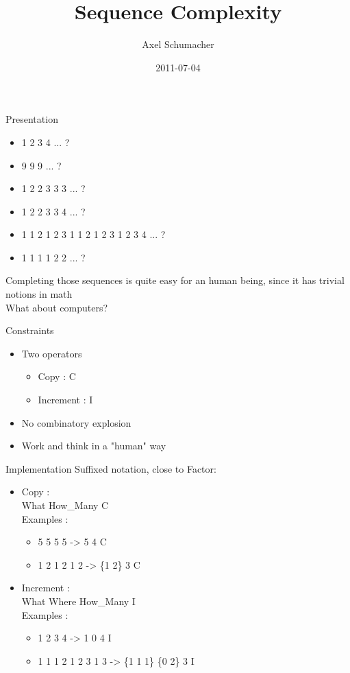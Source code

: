 \documentclass{beamer}
\title[Free Project]{Sequence Complexity}
\author{Axel Schumacher}
\institute{Télécom Paristech}
\date{2011-07-04}
\begin{document}
\begin{frame}
  \titlepage
\end{frame}

\begin{frame}{Presentation}
  \begin{itemize}
    \item{1 2 3 4 ... ?}
    \item{9 9 9 ... ?}
    \item{1 2 2 3 3 3 ... ?}
    \item{1 2 2 3 3 4 ... ?}
    \item{1 1 2 1 2 3 1 1 2 1 2 3 1 2 3 4 ... ?}
    \item{1 1 1 1 2 2 ... ? }
  \end{itemize}
  \begin{center}
  Completing those sequences is quite easy for an human being, since it has trivial notions in math\\
  What about computers?
  \end{center}
\end{frame}

\begin{frame}{Constraints}
  \begin{itemize}
    \item{
      Two operators
      \begin{itemize}
        \item{Copy : C}
        \item{Increment : I}
      \end{itemize}}
    \item{No combinatory explosion}
    \item{Work and think in a "human" way}
  \end{itemize}
\end{frame}

\begin{frame}{Implementation}
  Suffixed notation, close to Factor:\\
  \begin{itemize}
    \item{
      Copy :\\
      What How\_Many C\\
      Examples :
      \begin{itemize}
        \item{5 5 5 5 -> 5 4 C}
        \item{1 2 1 2 1 2 -> \{1 2\} 3 C}
      \end{itemize}}
    \item{
      Increment :\\
      What Where How\_Many I\\
      Examples :
      \begin{itemize}
        \item{1 2 3 4 -> 1 0 4 I}
        \item{1 1 1 2 1 2 3 1 3 -> \{1 1 1\} \{0 2\} 3 I}
      \end{itemize}}
  \end{itemize}
\end{frame}
\end{document}
